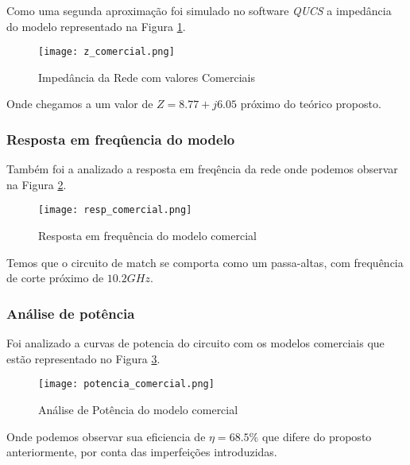 \documentclass[a4paper,12pt]{proc}
\begin{document}
\singlespacing

\noindent Como uma segunda aproximação foi simulado no software \textit{QUCS} a impedância do modelo representado na Figura \ref{z_comercial}.

\singlespacing

\begin{figure}[htbp]
    \centering
    \texttt{[image: z\_comercial.png]}
    \caption{Impedância da Rede com valores Comerciais}
    \label{z_comercial}
\end{figure}

\noindent Onde chegamos a um valor de $Z = 8.77+j6.05$ próximo do teórico proposto.

\subsubsection{Resposta em freqûencia do modelo}

\noindent Também foi a analizado a resposta em freqência da rede onde podemos observar na Figura \ref{resp_comercial}.

\singlespacing

\begin{figure}[htbp]
    \centering
    \texttt{[image: resp\_comercial.png]}
    \caption{Resposta em frequência do modelo comercial}
    \label{resp_comercial}
\end{figure}

\noindent Temos que o circuito de match se comporta como um passa-altas, com frequência de corte próximo de $10.2 GHz$.

\subsubsection{Análise de potência}

Foi analizado a curvas de potencia do circuito com os modelos comerciais que estão representado no Figura \ref{pot_comercial}.

\singlespacing

\begin{figure}[htbp]
    \centering
    \texttt{[image: potencia\_comercial.png]}
    \caption{Análise de Potência do modelo comercial}
    \label{pot_comercial}
\end{figure}

\noindent Onde podemos observar sua eficiencia de $\eta=68.5\%$ que difere do proposto anteriormente, por conta das imperfeições introduzidas.
\end{document}
